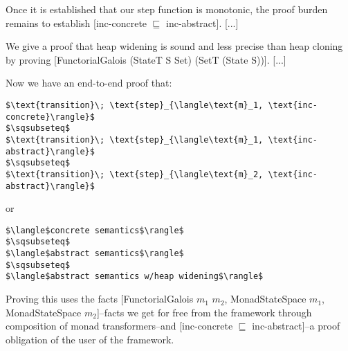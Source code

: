 Once it is established that our step function is monotonic, the proof burden
remains to establish [inc-concrete $\sqsubseteq$ inc-abstract]. [...]

We give a proof that heap widening is sound and less precise than heap cloning
by proving [FunctorialGalois (StateT S Set) (SetT (State S))]. [...]

Now we have an end-to-end proof that:
\begin{lstlisting}
$\text{transition}\; \text{step}_{\langle\text{m}_1, \text{inc-concrete}\rangle}$
$\sqsubseteq$
$\text{transition}\; \text{step}_{\langle\text{m}_1, \text{inc-abstract}\rangle}$
$\sqsubseteq$
$\text{transition}\; \text{step}_{\langle\text{m}_2, \text{inc-abstract}\rangle}$
\end{lstlisting}
or
\begin{lstlisting}
$\langle$concrete semantics$\rangle$
$\sqsubseteq$
$\langle$abstract semantics$\rangle$
$\sqsubseteq$
$\langle$abstract semantics w/heap widening$\rangle$
\end{lstlisting}
%
Proving this uses the facts [FunctorialGalois $m_1$ $m_2$, MonadStateSpace
$m_1$, MonadStateSpace $m_2$]--facts we get for free from the framework through
composition of monad transformers--and [inc-concrete $\sqsubseteq$
inc-abstract]--a proof obligation of the user of the framework.



